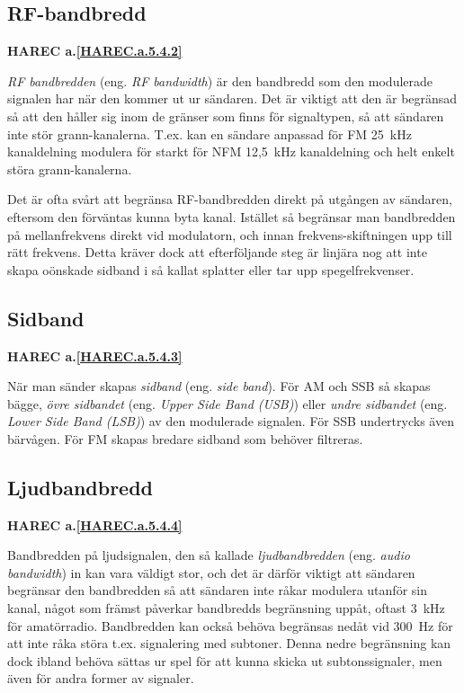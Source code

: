 \subsection{RF-bandbredd}
\textbf{HAREC
  a.\ref{HAREC.a.5.4.2}\label{myHAREC.a.5.4.2}
}

\emph{RF bandbredden} (eng. \emph{RF bandwidth}) är den bandbredd som den
modulerade signalen har när den kommer ut ur sändaren.
Det är viktigt att den är begränsad så att den håller sig inom de gränser
som finns för signaltypen, så att sändaren inte stör grann-kanalerna.
T.ex. kan en sändare anpassad för FM 25~kHz kanaldelning modulera för starkt för
NFM 12,5~kHz kanaldelning och helt enkelt störa grann-kanalerna.

Det är ofta svårt att begränsa RF-bandbredden direkt på utgången av sändaren,
eftersom den förväntas kunna byta kanal.
Istället så begränsar man bandbredden på mellanfrekvens direkt vid modulatorn,
och innan frekvens-skiftningen upp till rätt frekvens.
Detta kräver dock att efterföljande steg är linjära nog att inte skapa oönskade
sidband i så kallat splatter eller tar upp spegelfrekvenser.

\subsection{Sidband}
\textbf{HAREC
  a.\ref{HAREC.a.5.4.3}\label{myHAREC.a.5.4.3}
}

När man sänder skapas \emph{sidband} (eng. \emph{side band}).
För AM och SSB så skapas bägge, \emph{övre sidbandet}
(eng. \emph{Upper Side Band (USB)}) eller \emph{undre sidbandet}
(eng. \emph{Lower Side Band (LSB)}) av den modulerade signalen.
För SSB undertrycks även bärvågen.
För FM skapas bredare sidband som behöver filtreras.

\subsection{Ljudbandbredd}
\textbf{HAREC
  a.\ref{HAREC.a.5.4.4}\label{myHAREC.a.5.4.4}
}

Bandbredden på ljudsignalen, den så kallade \emph{ljudbandbredden} (eng.
\emph{audio bandwidth}) in kan vara väldigt stor, och det är därför viktigt
att sändaren begränsar den bandbredden så att sändaren inte råkar modulera
utanför sin kanal, något som främst påverkar bandbredds begränsning uppåt,
oftast 3~kHz för amatörradio.
Bandbredden kan också behöva begränsas nedåt vid 300~Hz för att inte råka
störa t.ex. signalering med subtoner.
Denna nedre begränsning kan dock ibland behöva sättas ur spel för att
kunna skicka ut subtonssignaler, men även för andra former av signaler.

